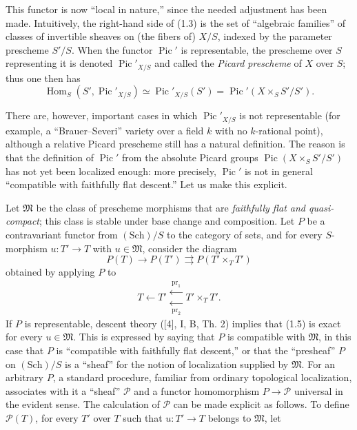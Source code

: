 This functor is now “local in nature,” since the needed adjustment has been
made. Intuitively, the right-hand side of (1.3) is the set of “algebraic
families” of classes of invertible sheaves on (the fibers of) $X/S$, indexed
by the parameter prescheme $S'/S$. When the functor $\operatorname{Pic}'$ is
representable, the prescheme over $S$ representing it is denoted
$\operatorname{Pic}'_{X/S}$ and called the \emph{Picard prescheme} of $X$ over
$S$; thus one then has
\begin{equation}
\operatorname{Hom}_S(S',\operatorname{Pic}'_{X/S})
\simeq\operatorname{Pic}'_{X/S}(S')
=\operatorname{Pic}'(X\times_SS'/S').
\tag{1.4}
\end{equation}

There are, however, important cases in which $\operatorname{Pic}'_{X/S}$ is not
representable (for example, a “Brauer--Severi” variety over a field $k$ with
no $k$-rational point), although a relative Picard prescheme still has a
natural definition. The reason is that the definition of
$\operatorname{Pic}'$ from the absolute Picard groups
$\operatorname{Pic}(X\times_SS'/S')$ has not yet been localized enough: more
precisely, $\operatorname{Pic}'$ is not in general “compatible with faithfully
flat descent.” Let us make this explicit.

Let $\mathfrak M$ be the class of prescheme morphisms that are
\emph{faithfully flat and quasi-compact}; this class is stable under base
change and composition. Let $P$ be a contravariant functor from
$(\mathrm{Sch})/S$ to the category of sets, and for every $S$-morphism
$u:T'\longrightarrow T$ with $u\in\mathfrak M$, consider the diagram
\begin{equation}
P(T)\longrightarrow P(T')\rightrightarrows P(T'\times_TT')
\tag{1.5}
\end{equation}
obtained by applying $P$ to
\[
T\longleftarrow T'\mathrel{\substack{\xleftarrow{\,\mathrm{pr}_1\,}\\[-0.35ex]
\xleftarrow[\,\mathrm{pr}_2\,]{}}}T'\times_TT'.
\]
If $P$ is representable, descent theory ([4], I, B, Th. 2) implies that (1.5)
is exact for every $u\in\mathfrak M$. This is expressed by saying that $P$ is
compatible with $\mathfrak M$, in this case that $P$ is “compatible with
faithfully flat descent,” or that the “presheaf” $P$ on $(\mathrm{Sch})/S$ is
a “sheaf” for the notion of localization supplied by $\mathfrak M$. For an
arbitrary $P$, a standard procedure, familiar from ordinary topological
localization, associates with it a “sheaf” $\mathcal P$ and a functor
homomorphism $P\longrightarrow\mathcal P$ universal in the evident sense. The
calculation of $\mathcal P$ can be made explicit as follows. To define
$\mathcal P(T)$, for every $T'$ over $T$ such that
$u:T'\longrightarrow T$ belongs to $\mathfrak M$, let


